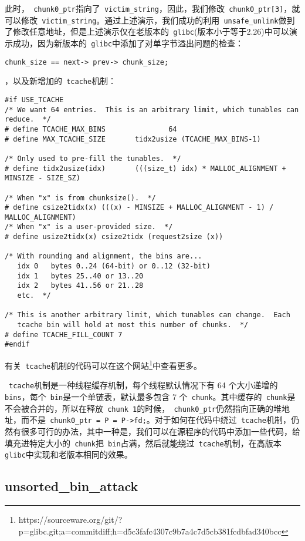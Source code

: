 此时，\verb+ chunk0_ptr+指向了\verb+ victim_string+，因此，我们修改\verb+ chunk0_ptr[3]+，就可以修改\verb+ victim_string+。通过上述演示，我们成功的利用\verb+ unsafe_unlink+做到了修改任意地址，但是上述演示仅在老版本的\verb+ glibc+(版本小于等于2.26)中可以演示成功，因为新版本的\verb+ glibc+中添加了对单字节溢出问题的检查：
\begin{verbatim}
chunk_size == next-> prev-> chunk_size;
\end{verbatim}
，以及新增加的\verb+ tcache+机制：
\begin{verbatim}
#if USE_TCACHE
/* We want 64 entries.  This is an arbitrary limit, which tunables can reduce.  */
# define TCACHE_MAX_BINS               64
# define MAX_TCACHE_SIZE       tidx2usize (TCACHE_MAX_BINS-1)

/* Only used to pre-fill the tunables.  */
# define tidx2usize(idx)       (((size_t) idx) * MALLOC_ALIGNMENT + MINSIZE - SIZE_SZ)

/* When "x" is from chunksize().  */
# define csize2tidx(x) (((x) - MINSIZE + MALLOC_ALIGNMENT - 1) / MALLOC_ALIGNMENT)
/* When "x" is a user-provided size.  */
# define usize2tidx(x) csize2tidx (request2size (x))

/* With rounding and alignment, the bins are...
   idx 0   bytes 0..24 (64-bit) or 0..12 (32-bit)
   idx 1   bytes 25..40 or 13..20
   idx 2   bytes 41..56 or 21..28
   etc.  */

/* This is another arbitrary limit, which tunables can change.  Each
   tcache bin will hold at most this number of chunks.  */
# define TCACHE_FILL_COUNT 7
#endif
\end{verbatim}

有关\verb+ tcache+机制的代码可以在这个网站\footnote{https://sourceware.org/git/?p=glibc.git;a=commitdiff;h=d5c3fafc4307c9b7a4c7d5cb381fcdbfad340bcc}中查看更多。

\verb+ tcache+机制是一种线程缓存机制，每个线程默认情况下有 64 个大小递增的\verb+ bins+，每个\verb+ bin+是一个单链表，默认最多包含 7 个\verb+ chunk+。其中缓存的\verb+ chunk+是不会被合并的，所以在释放\verb+ chunk 1+的时候，\verb+ chunk0_ptr+仍然指向正确的堆地址，而不是\verb+ chunk0_ptr = P = P->fd;+。对于如何在代码中绕过\verb+ tcache+机制，仍然有很多可行的办法，其中一种是，我们可以在源程序的代码中添加一些代码，给填充进特定大小的\verb+ chunk+把\verb+ bin+占满，然后就能绕过\verb+ tcache+机制，在高版本\verb+ glibc+中实现和老版本相同的效果。

\subsection{unsorted\_bin\_attack}

